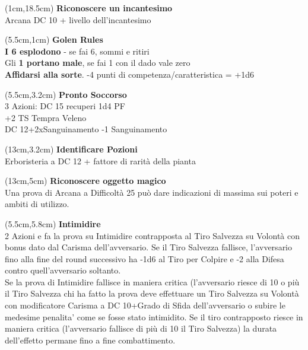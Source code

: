 \documentclass[a4paper,12 pt,openany]{book}
\begin{document}
	\begin{textblock*}{4cm}(1cm,18.5cm) %
\textbf{Riconoscere un incantesimo}\\ Arcana DC 10 + livello dell'incantesimo

	\end{textblock*}

	\begin{textblock*}{14.5cm}(5.5cm,1cm) %
	\textbf{Golen Rules}\\

	{\textbf{I 6 esplodono}} - se fai 6, sommi e ritiri\\
	Gli \textbf{1 portano male}, se fai 1 con il dado vale zero\\
	\textbf{Affidarsi alla sorte}. -4 punti di competenza/caratteristica = +1d6\\
\end{textblock*}

	\begin{textblock*}{7cm}(5.5cm,3.2cm) %
	\textbf{Pronto Soccorso}\\
3 Azioni: DC 15 recuperi 1d4 PF\\
+2 TS Tempra Veleno\\
DC 12+2xSanguinamento -1 Sanguinamento
\end{textblock*}

\begin{textblock*}{7cm}(13cm,3.2cm) %
\textbf{Identificare  Pozioni}\\
Erboristeria a DC 12 + fattore di rarità della pianta
\end{textblock*}

\begin{textblock*}{7cm}(13cm,5cm) %
\textbf{Riconoscere oggetto magico}\\
Una prova di Arcana a Difficoltà 25 può dare indicazioni di massima sui poteri e ambiti di utilizzo.
\end{textblock*}

{\small
	\begin{textblock*}{7cm}(5.5cm,5.8cm) %
\textbf{Intimidire}\\
2 Azioni e fa la prova su
Intimidire contrapposta al Tiro Salvezza su
Volontà con bonus dato dal Carisma
dell’avversario. Se il Tiro Salvezza fallisce,
l’avversario fino alla fine del round successivo ha
-1d6 al Tiro per Colpire e -2 alla Difesa contro
quell’avversario soltanto.\\
Se la prova di Intimidire fallisce in maniera
critica (l’avversario riesce di 10 o più il Tiro
Salvezza chi ha fatto la prova deve effettuare un
Tiro Salvezza su Volontà con modificatore
Carisma a DC 10+Grado di Sfida dell’avversario
o subire le medesime penalita’ come se fosse
stato intimidito. Se il tiro contrapposto riesce in
maniera critica (l’avversario fallisce di più di 10 il
Tiro Salvezza) la durata dell’effetto permane fino
a fine combattimento.
\end{textblock*}}
\end{document}
